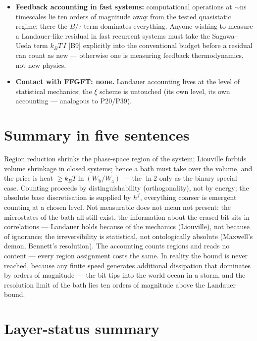 \documentclass[11pt,a4paper]{article}
\begin{document}
\begin{itemize}[leftmargin=1.4em,itemsep=0.35em]
  \item \textbf{Feedback accounting in fast systems:} computational operations at
        ${\sim}$ns timescales lie ten orders of magnitude away from the tested
        quasistatic regime; there the $B/\tau$ term dominates everything. Anyone
        wishing to measure a Landauer-like residual in fast recurrent systems must
        take the Sagawa--Ueda term $k_B T\,I$ [B9] explicitly into the conventional
        budget before a residual can count as new --- otherwise one is measuring
        feedback thermodynamics, not new physics.
  \item \textbf{Contact with FFGFT: none.} Landauer accounting lives at the level
        of statistical mechanics; the $\xi$ scheme is untouched (its own level,
        its own accounting --- analogous to P20/P39).
\end{itemize}

\section{Summary in five sentences}

Region reduction shrinks the phase-space region of the system; Liouville forbids
volume shrinkage in closed systems; hence a bath must take over the volume, and
the price is heat $\ge k_B T \ln(W_{\text{b}}/W_{\text{a}})$ --- the $\ln 2$ only
as the binary special case. Counting proceeds by distinguishability
(orthogonality), not by energy; the absolute base discretisation is supplied by
$h^f$, everything coarser is emergent counting at a chosen level. Not measurable
does not mean not present: the microstates of the bath all still exist, the
information about the erased bit sits in correlations --- Landauer holds because
of the mechanics (Liouville), not because of ignorance; the irreversibility is
statistical, not ontologically absolute (Maxwell's demon, Bennett's resolution).
The accounting counts regions and reads no content --- every region assignment
costs the same. In reality the bound is never reached, because any finite speed
generates additional dissipation that dominates by orders of magnitude --- the bit
tips into the world ocean in a storm, and the resolution limit of the bath lies
ten orders of magnitude above the Landauer bound.

\section{Layer-status summary}
\end{document}
